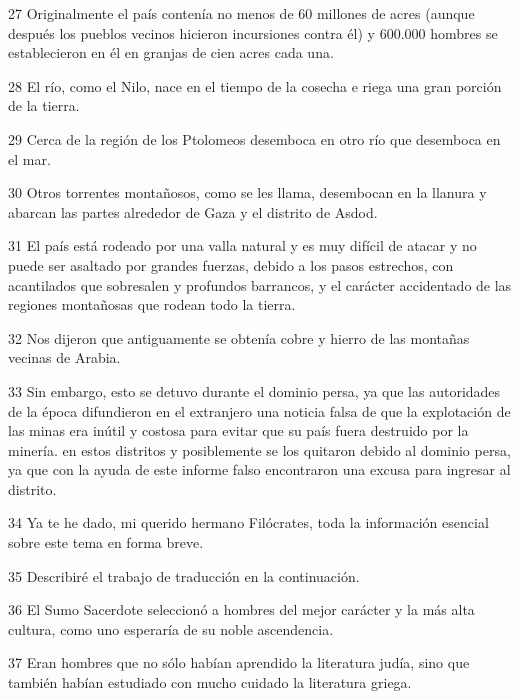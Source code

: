\par 27 Originalmente el país contenía no menos de 60 millones de acres (aunque después los pueblos vecinos hicieron incursiones contra él) y 600.000 hombres se establecieron en él en granjas de cien acres cada una.

\par 28 El río, como el Nilo, nace en el tiempo de la cosecha e riega una gran porción de la tierra.

\par 29 Cerca de la región de los Ptolomeos desemboca en otro río que desemboca en el mar.

\par 30 Otros torrentes montañosos, como se les llama, desembocan en la llanura y abarcan las partes alrededor de Gaza y el distrito de Asdod.

\par 31 El país está rodeado por una valla natural y es muy difícil de atacar y no puede ser asaltado por grandes fuerzas, debido a los pasos estrechos, con acantilados que sobresalen y profundos barrancos, y el carácter accidentado de las regiones montañosas que rodean todo la tierra.

\par 32 Nos dijeron que antiguamente se obtenía cobre y hierro de las montañas vecinas de Arabia.

\par 33 Sin embargo, esto se detuvo durante el dominio persa, ya que las autoridades de la época difundieron en el extranjero una noticia falsa de que la explotación de las minas era inútil y costosa para evitar que su país fuera destruido por la minería. en estos distritos y posiblemente se los quitaron debido al dominio persa, ya que con la ayuda de este informe falso encontraron una excusa para ingresar al distrito.

\par 34 Ya te he dado, mi querido hermano Filócrates, toda la información esencial sobre este tema en forma breve.

\par 35 Describiré el trabajo de traducción en la continuación.

\par 36 El Sumo Sacerdote seleccionó a hombres del mejor carácter y la más alta cultura, como uno esperaría de su noble ascendencia.

\par 37 Eran hombres que no sólo habían aprendido la literatura judía, sino que también habían estudiado con mucho cuidado la literatura griega.

